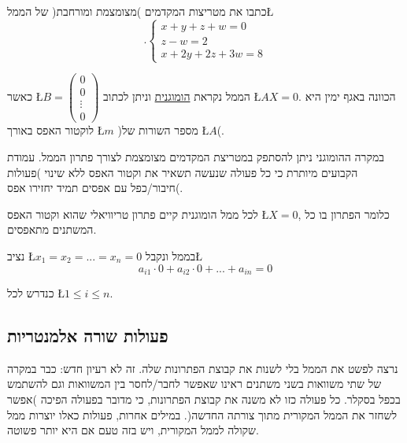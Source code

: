 \begin{self}
כתבו את מטריצות המקדמים )מצומצמת ומורחבת( של הממ\textquotedbl ל\L{%
\[
.\begin{cases}
x+y+z+w=0\\
z-w=2\\
x+2y+2z+3w=8
\end{cases}
\]
}%
\end{self}

\begin{hdef}
כאשר \L{$B=\begin{pmatrix}0\\
0\\
\vdots\\
0
\end{pmatrix}$} הממ\textquotedbl ל נקראת \uline{הומוגנית} וניתן לכתוב \L{$AX=0$}.
הכוונה באגף ימין היא לוקטור האפס באורך \L{$m$} )מספר השורות של \L{$A$}(.
\end{hdef}

במקרה ההומוגני ניתן להסתפק במטריצת המקדמים מצומצמת לצורך פתרון הממ\textquotedbl ל.
עמודת הקבועים מיותרת כי כל פעולה שנעשה תשאיר את וקטור האפס ללא שינוי
)פעולות חיבור/כפל עם אפסים תמיד יחזירו אפס(.

\begin{prop}
לכל ממ\textquotedbl ל הומוגנית קיים פתרון טריוויאלי שהוא וקטור
האפס \L{$X=0$}, כלומר הפתרון בו כל המשתנים מתאפסים.
\end{prop}

\begin{hproof}
נציב \L{$x_{1}=x_{2}=...=x_{n}=0$} בממ\textquotedbl ל ונקבל\L{%
\[
a_{i1}\cdot0+a_{i2}\cdot0+...+a_{in}=0
\]
}%

כנדרש לכל \L{$1\leq i\leq n$}.
\end{hproof}

\subsection{פעולות שורה אלמנטריות}

נרצה לפשט את הממ\textquotedbl ל בלי לשנות את קבוצת הפתרונות שלה.
זה לא רעיון חדש: כבר במקרה של שתי משוואות בשני משתנים ראינו שאפשר
לחבר/לחסר בין המשוואות וגם להשתמש בכפל בסקלר. כל פעולה כזו לא משנה
את קבוצת הפתרונות, כי מדובר בפעולה הפיכה )אפשר לשחזר את הממ\textquotedbl ל
המקורית מתוך צורתה החדשה(. במילים אחרות, פעולות כאלו יוצרות ממ\textquotedbl ל
שקולה לממ\textquotedbl ל המקורית, ויש בזה טעם אם היא יותר פשוטה. 

